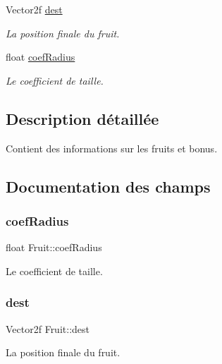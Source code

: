 \begin{DoxyCompactItemize}
Vector2f \hyperlink{struct_fruit_aeaf00c0ccb20106e22b4e44527eaa02e}{dest}
\begin{DoxyCompactList}\small\item\em La position finale du fruit. \end{DoxyCompactList}\item 
float \hyperlink{struct_fruit_ae5a056bd55b04d92a295125e2b2f724f}{coef\+Radius}
\begin{DoxyCompactList}\small\item\em Le coefficient de taille. \end{DoxyCompactList}\end{DoxyCompactItemize}


\subsection{Description détaillée}
Contient des informations sur les fruits et bonus. 

\subsection{Documentation des champs}
\mbox{\label{struct_fruit_ae5a056bd55b04d92a295125e2b2f724f}} 
\subsubsection{\texorpdfstring{coef\+Radius}{coefRadius}}
{\footnotesize\ttfamily float Fruit\+::coef\+Radius}



Le coefficient de taille. 

\mbox{\label{struct_fruit_aeaf00c0ccb20106e22b4e44527eaa02e}} 
\subsubsection{\texorpdfstring{dest}{dest}}
{\footnotesize\ttfamily Vector2f Fruit\+::dest}



La position finale du fruit. 

\mbox{\label{struct_fruit_a7899212f1f18f4ec648272999084a98b}} 

